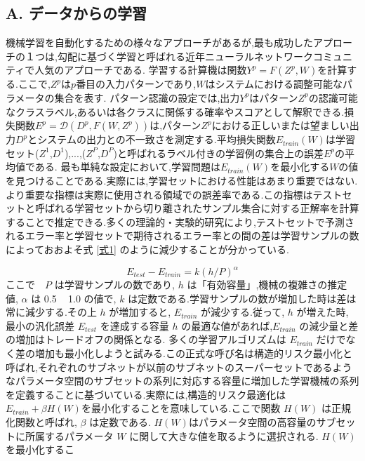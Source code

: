 \documentclass[twocolumn]{jarticle}     %
\begin{document}
\subsection*{A. データからの学習}
機械学習を自動化するための様々なアプローチがあるが,最も成功したアプローチの１つは,勾配に基づく学習と呼ばれる近年ニューラルネットワークコミュニティで人気のアプローチである.
学習する計算機は関数$Y^p = F(Z^p,W)$を計算する.ここで,$Z^p$は$p$番目の入力パターンであり,$W$はシステムにおける調整可能なパラメータの集合を表す.
パターン認識の設定では,出力$Y^p$はパターン$Z^p$の認識可能なクラスラベル,あるいは各クラスに関係する確率やスコアとして解釈できる.損失関数$E^p = \mathcal{D}(D^p,F(W,Z^p))$は,パターン$Z^p$における正しいまたは望ましい出力$D^p$とシステムの出力との不一致さを測定する.平均損失関数$E_{train}(W)$は学習セット{($Z^1$,$D^1$),...,($Z^P$,$D^P$)}と呼ばれるラベル付きの学習例の集合上の誤差$E^p$の平均値である.
最も単純な設定において,学習問題は$E_{train}(W)$を最小化する$W$の値を見つけることである.実際には,学習セットにおける性能はあまり重要ではない.より重要な指標は実際に使用される領域での誤差率である.この指標はテストセットと呼ばれる学習セットから切り離されたサンプル集合に対する正解率を計算することで推定できる.多くの理論的・実験的研究\cite{3,4,5}により,テストセットで予測されるエラー率と学習セットで期待されるエラー率との間の差は学習サンプルの数によっておおよそ式 \ref{式1} のように減少することが分かっている. 

\begin{equation}
  E_{test} - E_{train} = k({h}/{P})^\alpha
  \label{式1}
\end{equation}
ここで　$P$ は学習サンプルの数であり, 
$h$ は「有効容量」,機械の複雑さの推定値, $\alpha$ は 0.5 ~ 1.0 の値で, $k$ は定数である.学習サンプルの数が増加した時は差は常に減少する.その上 $h$ が増加すると, $E_{train}$ が減少する.従って, $h$ が増えた時, 最小の汎化誤差 $E_{test}$ を達成する容量 $h$ の最適な値があれば,$E_{train}$ の減少量と差の増加はトレードオフの関係となる.
多くの学習アルゴリズムは $E_{train}$ だけでなく差の増加も最小化しようと試みる.この正式な呼び名は構造的リスク最小化と呼ばれ,それぞれのサブネットが以前のサブネットのスーパーセットであるようなパラメータ空間のサブセットの系列に対応する容量に増加した学習機械の系列を定義することに基づいている.実際には,構造的リスク最適化は $E_{train} + \beta H(W)$を最小化することを意味している.ここで関数 $H(W)$ は正規化関数と呼ばれ, $\beta$ は定数である. $H(W)$はパラメータ空間の高容量のサブセットに所属するパラメータ $W$ に関して大きな値を取るように選択される. $H(W)$ を最小化するこ





\end{document}
